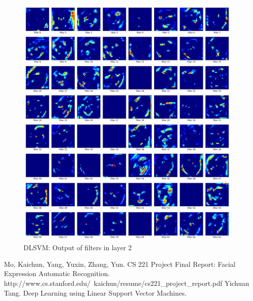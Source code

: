\documentclass[fleqn,a4paper,12pt]{article}
\begin{document}
\begin{figure}[h]
  \centering
  \includegraphics[width=\linewidth]{report-imgs/dlsvm-filter-output.png}
  \caption{DLSVM: Output of filters in layer 2}
  \label{fig:Output of filters in layer 2}
\end{figure}


\clearpage

\begin{thebibliography}{99}
Mo, Kaichun, Yang, Yuxin, Zhang, Yun. CS  221  Project  Final  Report:  Facial  Expression  Automatic  Recognition. http://www.cs.stanford.edu/~kaichun/resume/cs221\_project\_report.pdf
Yichuan Tang. Deep Learning using Linear Support Vector Machines.  
\end{thebibliography}
\end{document}
